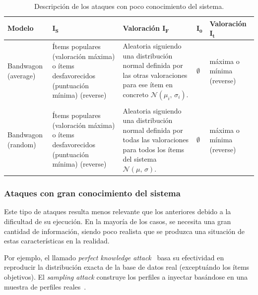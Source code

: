 \begin{table}
\small
\begin{centering}
	
		\begin{tabular}{@{}p{5em} p{8em} p{8em} p{2em} p{7em}@{}}
			\toprule
			\textbf{Modelo} & $\mathbf{I_S}$ & \textbf{Valoración} $\mathbf{I_F}$ & $\mathbf{I_0}$ & \textbf{Valoración} $\mathbf{I_t}$\\ 
			\midrule
			
			Bandwagon (average) & Ítems populares (valoración máxima) o ítems desfavorecidos (puntuación mínima) (reverse) & Aleatoria siguiendo una distribución normal definida por las otras valoraciones para ese ítem en concreto $\mathcal{N}(\mu_i,\,\sigma_i)$. & $\emptyset$ & máxima o mínima (reverse) \\\\
			
			Bandwagon (random) & Ítems populares (valoración máxima) o ítems desfavorecidos (puntuación mínima) (reverse) & Aleatoria siguiendo una distribución normal definida por todas las valoraciones para todos los ítems del sistema $\mathcal{N}(\mu,\,\sigma)$. & $\emptyset$ & máxima o mínima (reverse) \\
			\bottomrule
		\end{tabular}

\end{centering}
\caption{Descripción de los ataques con poco conocimiento del sistema.}
\label{tabla_descripcion_ataques_poco_con}
\end{table}


\subsubsection{Ataques con gran conocimiento del sistema}

Este tipo de ataques resulta menos relevante que los anteriores debido a la dificultad de su ejecución. En la mayoría de los casos, se necesita una gran cantidad de información, siendo poco realista que se produzca una situación de estas características en la realidad.

Por ejemplo, el llamado \textit{perfect knowledge attack}~\cite{Mobasher2006Thesis} basa su efectividad en reproducir la distribución exacta de la base de datos real (exceptuándo los ítems objetivos). El \textit{sampling attack} construye los perfiles a inyectar basándose en una muestra de perfiles reales~\cite{mingdan2018ShillingAttacksAReview}.

